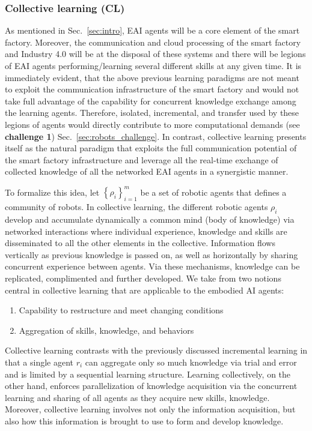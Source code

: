 \subsubsection{\textbf{Collective learning (CL)}}
As mentioned in Sec.~\ref{sec:intro}, EAI agents will be a core element of the smart factory. Moreover, the communication and cloud processing of the smart factory and Industry 4.0 will be at the disposal of these systems and there will be legions of EAI agents performing/learning several different skills at any given time. It is immediately evident, that the above previous learning paradigms are not meant to exploit the communication infrastructure of the smart factory and would not take full advantage of the capability for concurrent knowledge exchange among the learning agents. Therefore, isolated, incremental, and transfer used by these legions of agents 
would directly contribute to more computational demands (see \textbf{challenge 1}) Sec.~\ref{sec:robots_challenge}. In contrast, collective learning presents itself as the natural paradigm that exploits the full communication potential of the smart factory infrastructure and leverage all the real-time exchange of collected knowledge of all the networked EAI agents in a synergistic manner.



To formalize this idea, let $ \left\lbrace \rho_i \right\rbrace_{i=1}^{m} $ be a set of robotic agents that defines a community of robots. In collective learning, the different robotic agents $ \rho_i $ develop and accumulate dynamically a common mind (body of knowledge) via networked interactions where individual experience, knowledge and skills are disseminated to all the other elements in the collective. Information flows vertically as previous knowledge is passed on, as well as horizontally by sharing concurrent experience between agents. Via these mechanisms, knowledge can be replicated, complimented and further developed. We take from \cite{Garavan2012CollectiveLearning} two notions central in collective learning that are applicable to the embodied AI agents:
\begin{enumerate}
	\item Capability to restructure and meet changing conditions
	\item Aggregation of skills, knowledge, and behaviors
\end{enumerate}
Collective learning contrasts with the previously discussed incremental learning in that a single agent $ r_i $ can aggregate only so much knowledge via trial and error and is limited by a sequential learning structure. Learning collectively, on the other hand, enforces parallelization of knowledge acquisition via the concurrent learning and sharing of all agents as they acquire new skills, knowledge. Moreover, collective learning involves not only the information acquisition, but also how this information is brought to use to form and develop knowledge. 

